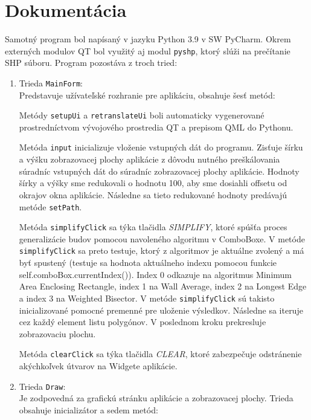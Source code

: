 \documentclass[11pt]{article}
\begin{document}
\section{Dokumentácia}
Samotný program bol napísaný v jazyku Python 3.9 v SW PyCharm. Okrem externých modulov QT bol využitý aj modul \texttt{pyshp}, ktorý slúži na prečítanie SHP súboru. Program pozostáva z troch tried:
\begin{enumerate}
    \item  Trieda \texttt{MainForm}:\\
Predstavuje užívateľské rozhranie pre aplikáciu, obsahuje šesť metód:

Metódy \texttt{setupUi} a \texttt{retranslateUi} boli automaticky vygenerované prostredníctvom vývojového prostredia QT a prepisom QML do Pythonu.

Metóda \texttt{input} inicializuje vloženie vstupných dát do programu. Zisťuje šírku a výšku zobrazovacej plochy aplikácie z dôvodu nutného preškálovania súradníc vstupných dát do súradníc zobrazovacej plochy aplikácie. Hodnoty šírky a výšky sme redukovali o hodnotu 100, aby sme dosiahli offsetu od okrajov okna aplikácie. Následne sa tieto redukované hodnoty  predávajú metóde \texttt{setPath}.

Metóda \texttt{simplifyClick} sa týka tlačidla \textit{SIMPLIFY}, ktoré spúšťa proces generalizácie budov pomocou navoleného algoritmu v ComboBoxe. V metóde \texttt{simplifyClick} sa preto testuje, ktorý z algoritmov je aktuálne zvolený a má byť spustený (testuje sa hodnota aktuálneho indexu pomocou funkcie self.comboBox.currentIndex()). Index 0 odkazuje na algoritmus Minimum Area Enclosing Rectangle, index 1 na Wall Average, index 2 na Longest Edge a index 3 na Weighted Bisector. V metóde \texttt{simplifyClick} sú takisto inicializované pomocné premenné pre uloženie výsledkov.\newline
Následne sa iteruje cez každý element listu polygónov. V poslednom kroku prekresluje zobrazovaciu plochu.

Metóda \texttt{clearClick} sa týka tlačidla \textit{CLEAR}, ktoré zabezpečuje odstránenie akýchkoľvek útvarov na Widgete aplikácie.  

\newline
    \item Trieda \texttt{Draw}:\\
Je zodpovedná za grafickú stránku aplikácie a zobrazovacej plochy. Trieda obsahuje inicializátor a sedem metód:


\end{enumerate}
\end{document}
